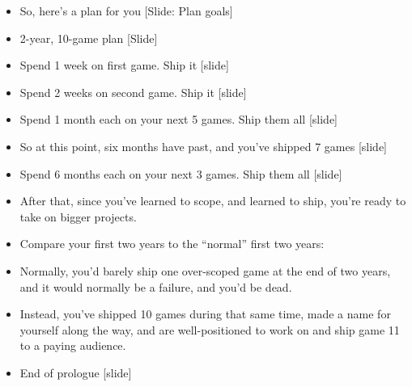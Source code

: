\documentclass[12pt]{article}
\begin{document}
{\begin{itemize}
\item So, here's a plan for you [Slide:  Plan goals]

\item 2-year, 10-game plan [Slide]

\item Spend 1 week on first game. Ship it [slide]

\item Spend 2 weeks on second game.  Ship it [slide]

\item Spend 1 month each on your next 5 games.  Ship them all [slide]

\item So at this point, six months have past, and you've shipped 7 games [slide]

\item Spend 6 months each on your next 3 games.  Ship them all [slide]

\item After that, since you've learned to scope, and learned to ship, you're ready to take on bigger projects.

\item Compare your first two years to the ``normal'' first two years:

\item Normally, you'd barely ship one over-scoped game at the end of two years, and it would normally be a failure, and you'd be dead.

\item Instead, you've shipped 10 games during that same time, made a name for yourself along the way, and are well-positioned to work on and ship game 11 to a paying audience.

\item End of prologue [slide]


\end{itemize}

}
\end{document}
